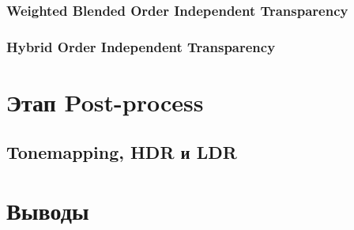 		\subsubsection{Weighted Blended Order Independent Transparency} \label{ch3:render_pass:transparents:wboit}
		\subsubsection{Hybrid Order Independent Transparency} \label{ch3:render_pass:transparents:hybrid_oit}
		
\section{Этап Post-process} \label{ch3:post_process}
	\subsection{Tonemapping, HDR и LDR} \label{ch3:post_process:hdr_ldr_tonemapping}
\section{Выводы} \label{ch3:conclusion}

%
